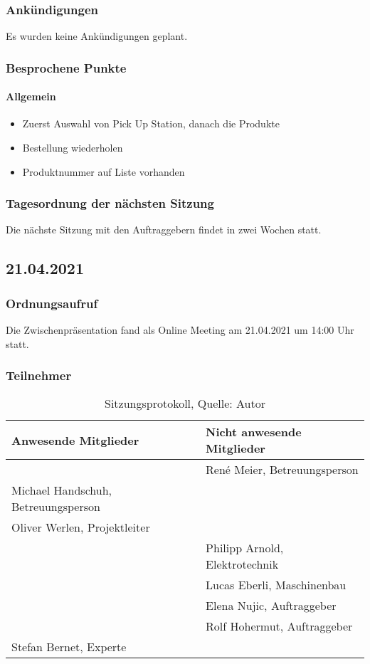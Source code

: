 \subsubsection{Ankündigungen}
Es wurden keine Ankündigungen geplant.
\subsubsection{Besprochene Punkte}
\paragraph{Allgemein}
\begin{itemize}
	\item Zuerst Auswahl von Pick Up Station, danach die Produkte
	\item Bestellung wiederholen
	\item Produktnummer auf Liste vorhanden
\end{itemize}
\subsubsection{Tagesordnung der nächsten Sitzung}
Die nächste Sitzung mit den Auftraggebern findet in zwei Wochen statt. 
\newpage
\subsection{21.04.2021}
\subsubsection{Ordnungsaufruf}
Die Zwischenpräsentation fand als Online Meeting am 21.04.2021 um 14:00 Uhr statt.
\subsubsection{Teilnehmer}
\begin{table}[H]
	\setlength\extrarowheight{2pt} %
	\begin{tabularx}{\textwidth}{|X|X|}
		\hline
		\textbf{Anwesende Mitglieder} &  \textbf{Nicht anwesende Mitglieder} \\
		\hline
		& René Meier, Betreuungsperson   \\
		 Michael Handschuh, Betreuungsperson  & \\
		Oliver Werlen, Projektleiter &  \\
		&Philipp Arnold, Elektrotechnik  \\
		& Lucas Eberli, Maschinenbau \\
		&Elena Nujic, Auftraggeber  \\
		&Rolf Hohermut, Auftraggeber  \\
		Stefan Bernet, Experte &\\
		\hline
	\end{tabularx}
	\caption{ \label{tbl: Teilnehmerliste vom 21.04.2021}Sitzungsprotokoll, Quelle: Autor}
\end{table}
